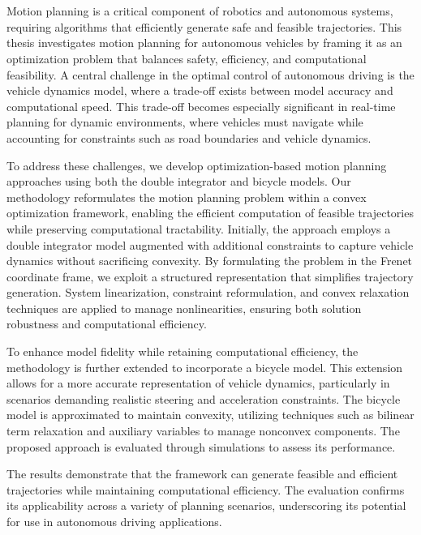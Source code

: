 \chapter{\abstractname}
Motion planning is a critical component of robotics and autonomous systems, requiring algorithms that efficiently generate safe and feasible
trajectories.
This thesis investigates motion planning for autonomous vehicles by framing it as an optimization problem that balances safety, efficiency, and
computational feasibility.
A central challenge in the optimal control of autonomous driving is the vehicle dynamics model, where a trade-off exists between model accuracy and
computational speed.
This trade-off becomes especially significant in real-time planning for dynamic environments, where vehicles must navigate while accounting for
constraints such as road boundaries and vehicle dynamics.

To address these challenges, we develop optimization-based motion planning approaches using both the double integrator and bicycle models.
Our methodology reformulates the motion planning problem within a convex optimization framework, enabling the efficient computation of feasible
trajectories while preserving computational tractability.
Initially, the approach employs a double integrator model augmented with additional constraints to capture vehicle dynamics without sacrificing
convexity.
By formulating the problem in the Frenet coordinate frame, we exploit a structured representation that simplifies trajectory generation.
System linearization, constraint reformulation, and convex relaxation techniques are applied to manage nonlinearities, ensuring both solution
robustness and computational efficiency.

To enhance model fidelity while retaining computational efficiency, the methodology is further extended to incorporate a bicycle model.
This extension allows for a more accurate representation of vehicle dynamics, particularly in scenarios demanding realistic steering and acceleration
constraints.
The bicycle model is approximated to maintain convexity, utilizing techniques such as bilinear term relaxation and auxiliary variables to manage
nonconvex components.
The proposed approach is evaluated through simulations to assess its performance.

The results demonstrate that the framework can generate feasible and efficient trajectories while maintaining computational efficiency.
The evaluation confirms its applicability across a variety of planning scenarios, underscoring its potential for use in autonomous driving
applications.

